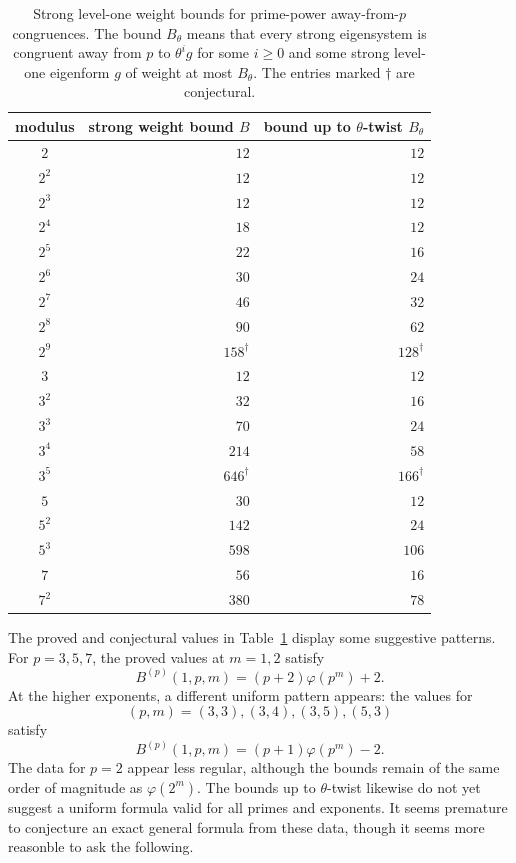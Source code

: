 \documentclass[11pt]{article}
\theoremstyle{plain}
\theoremstyle{definition}
\theoremstyle{remark}
\numberwithin{equation}{section}
\begin{document}
\begin{table}[ht]
\centering
\begin{tabular}{c|r|r}
\hline
modulus
&
strong weight bound \(B\)
&
bound up to \(\theta\)-twist \(B_\theta\)
\\
\hline
\(2\)       & \(12\)  & \(12\) \\
\(2^2\)     & \(12\)  & \(12\) \\
\(2^3\)     & \(12\)  & \(12\) \\
\(2^4\)     & \(18\)  & \(12\) \\
\(2^5\)     & \(22\)  & \(16\) \\
\(2^6\)     & \(30\)  & \(24\) \\
\(2^7\)     & \(46\)  & \(32\) \\
\(2^8\)     & \(90\)  & \(62\) \\
\(2^9\)     & \(158^{\dagger}\) & \(128^{\dagger}\) \\
\hline
\(3\)       & \(12\)  & \(12\) \\
\(3^2\)     & \(32\)  & \(16\) \\
\(3^3\)     & \(70\)  & \(24\) \\
\(3^4\)     & \(214\) & \(58\) \\
\(3^5\)     & \(646^{\dagger}\) & \(166^{\dagger}\) \\
\hline
\(5\)       & \(30\)  & \(12\) \\
\(5^2\)     & \(142\) & \(24\) \\
\(5^3\)     & \(598\) & \(106\) \\
\hline
\(7\)       & \(56\)  & \(16\) \\
\(7^2\)     & \(380\) & \(78\) \\
\hline
\end{tabular}
\caption{Strong level-one weight bounds for prime-power away-from-\(p\) congruences. The bound \(B_\theta\) means that every strong eigensystem is congruent away from \(p\) to \(\theta^i g\) for some \(i\geq0\) and some strong level-one eigenform \(g\) of weight at most \(B_\theta\). The entries marked \(\dagger\) are conjectural.}\label{tab:strong-weight-bounds}
\end{table}

The proved and conjectural values in Table~\ref{tab:strong-weight-bounds} display some suggestive patterns. For \(p=3,5,7\), the proved values at \(m=1,2\) satisfy \[ B^{(p)}(1,p,m)=(p+2)\varphi(p^m)+2. \] At the higher exponents, a different uniform pattern appears: the values for \[ (p,m)=(3,3),(3,4),(3,5),(5,3) \] satisfy \[ B^{(p)}(1,p,m)=(p+1)\varphi(p^m)-2. \] The data for \(p=2\) appear less regular, although the bounds remain of the same order of magnitude as \(\varphi(2^m)\). The bounds up to \(\theta\)-twist likewise do not yet suggest a uniform formula valid for all primes and exponents. It seems premature to conjecture an exact general formula from these data, though it seems more reasonble to ask the following.
\end{document}
